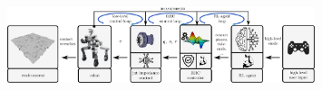 \begin{columns}[t]

	\begin{Large}
	
	\begin{column}{0.3\textwidth}
		
		
		\vspace{10cm}

	\end{column}

	\begin{column}{0.7\textwidth}
		\begin{figure}[h]
			\includegraphics[width=0.8\textwidth]{docs/imgs/approach.png}
		\end{figure}
		\vspace{10cm}
		
	\end{column}
	\end{Large}
\end{columns}